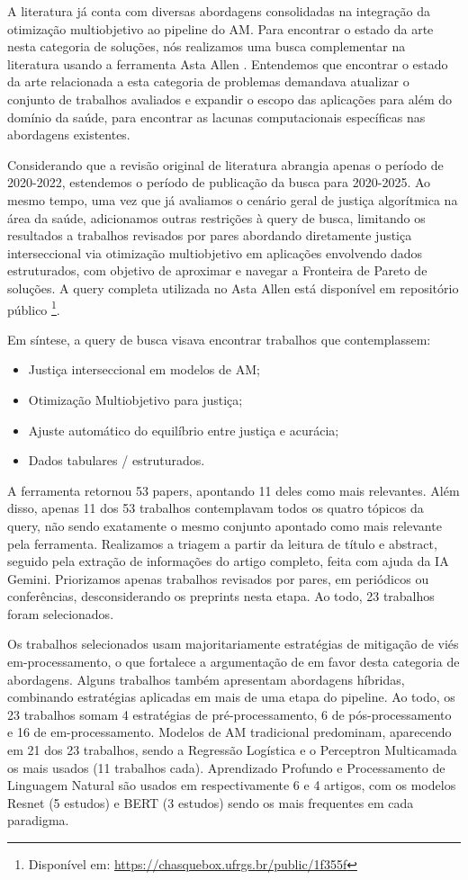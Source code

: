 A literatura já conta com diversas abordagens consolidadas na integração da otimização multiobjetivo ao pipeline do AM. Para encontrar o estado da arte nesta categoria de soluções, nós realizamos uma busca complementar na literatura usando a ferramenta Asta Allen \cite{asta}. Entendemos que encontrar o estado da arte relacionada a esta categoria de problemas demandava atualizar o conjunto de trabalhos avaliados e expandir o escopo das aplicações para além do domínio da saúde, para encontrar as lacunas computacionais específicas nas abordagens existentes.

Considerando que a revisão original de literatura abrangia apenas o período de 2020-2022, estendemos o período de publicação da busca para 2020-2025. Ao mesmo tempo, uma vez que já avaliamos o cenário geral de justiça algorítmica na área da saúde, adicionamos outras restrições à query de busca, limitando os resultados a trabalhos revisados por pares abordando diretamente justiça interseccional via otimização multiobjetivo em aplicações envolvendo dados estruturados, com objetivo de aproximar e navegar a Fronteira de Pareto de soluções. A query completa utilizada no Asta Allen está disponível em repositório público \footnote{Disponível em: \url{https://chasquebox.ufrgs.br/public/1f355f}}.

Em síntese, a query de busca visava encontrar trabalhos que contemplassem:
\begin{itemize}
    \item Justiça interseccional em modelos de AM;
    \item Otimização Multiobjetivo para justiça;
    \item Ajuste automático do equilíbrio entre justiça e acurácia;
    \item Dados tabulares / estruturados.
\end{itemize}

A ferramenta retornou 53 papers, apontando 11 deles como mais relevantes. Além disso, apenas 11 dos 53 trabalhos contemplavam todos os quatro tópicos da query, não sendo exatamente o mesmo conjunto apontado como mais relevante pela ferramenta. Realizamos a triagem a partir da leitura de título e abstract, seguido pela extração de informações do artigo completo, feita com ajuda da IA Gemini. Priorizamos apenas trabalhos revisados por pares, em periódicos ou conferências, desconsiderando os preprints nesta etapa. Ao todo, 23 trabalhos foram selecionados.

Os trabalhos selecionados usam majoritariamente estratégias de mitigação de viés em-processamento, o que fortalece a argumentação de \citet{wang2020pursuit} em favor desta categoria de abordagens. Alguns trabalhos também apresentam abordagens híbridas, combinando estratégias aplicadas em mais de uma etapa do pipeline. Ao todo, os 23 trabalhos somam 4 estratégias de pré-processamento, 6 de pós-processamento e 16 de em-processamento. Modelos de AM tradicional predominam, aparecendo em 21 dos 23 trabalhos, sendo a Regressão Logística e o Perceptron Multicamada os mais usados (11 trabalhos cada). Aprendizado Profundo e Processamento de Linguagem Natural são usados em respectivamente 6 e 4 artigos, com os modelos Resnet (5 estudos) e BERT (3 estudos) sendo os mais frequentes em cada paradigma.


